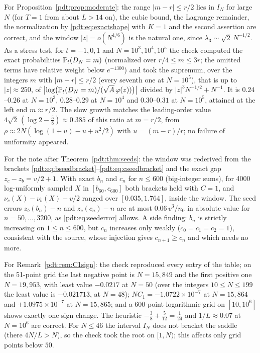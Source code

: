 For Proposition~\ref{pdt:prop:moderate}: the range $|m-r|\le r/2$ lies in
$I_N$ for large $N$ (for $T=1$ from about $L>14$ on), the cubic bound, the
Lagrange remainder, the normalization by \eqref{pdt:eq:exactshape} with
$K=1$ and the second assertion are correct, and the window
$|z|=o(N^{1/6})$ is the natural one, since $\lambda_3\sim\sqrt2\,N^{-1/2}$.
As a stress test, for $t=-1,0,1$ and $N=10^3,10^4,10^5$ the check computed
the exact probabilities $\mathbb P_t(D_N=m)$ (normalized over $r/4\le m\le3r$;
the omitted terms have relative weight below $e^{-1300}$) and took the
supremum, over the integers $m$ with $|m-r|\le r/2$ (every seventh one at
$N=10^5$), that is up to $|z|\approx250$, of
$\bigl|\log\bigl(\mathbb P_t(D_N=m)/(\sqrt A\,\varphi(z))\bigr)\bigr|$ divided by
$|z|^3N^{-1/2}+N^{-1}$. It is $0.24$--$0.26$ at $N=10^3$, $0.28$--$0.29$ at
$N=10^4$ and $0.30$--$0.31$ at $N=10^5$, attained at the left end
$m\approx r/2$. The slow growth matches the leading-order value
$4\sqrt2\,(\log2-\frac58)\approx0.385$ of this ratio at $m=r/2$, from
$\rho\approx2N(\log(1+u)-u+u^2/2)$ with $u=(m-r)/r$; no failure of
uniformity appeared.

For the note after Theorem~\ref{pdt:thm:seeds}: the window was rederived
from the brackets \eqref{pdt:eq:bseedbracket}--\eqref{pdt:eq:cseedbracket}
and the exact gap $z_c-z_b=v/2+1$. With exact $b_n$ and $c_n$ for
$n\le600$ (big-integer sums), for 4000 log-uniformly sampled $X$ in
$[b_{60},c_{600}]$ both brackets held with $C=1$, and
$\nu_c(X)-\nu_b(X)-v/2$ ranged over $[0.035,1.764]$, inside the window. The
seed errors $z_b(b_n)-n$ and $z_c(c_n)-n$ are at most $0.06\,v^3/n_0$ in
absolute value for $n=50,\ldots,3200$, as \eqref{pdt:eq:seederror} allows.
A side finding: $b_n$ is strictly increasing on $1\le n\le600$, but $c_n$
increases only weakly ($c_0=c_1=c_2=1$), consistent with the source, whose
injection gives $c_{n+1}\ge c_n$ and which needs no more.

For Remark~\ref{pdt:rem:C1sign}: the check reproduced every entry of the
table; on the 51-point grid the last negative point is $N=15{,}849$ and
the first positive one $N=19{,}953$, with least value $-0.0217$ at $N=50$
(over the integers $10\le N\le199$ the least value is $-0.021713$, at
$N=48$); $NC_1=-1.0722\times10^{-7}$ at $N=15{,}864$ and
$+1.0975\times10^{-7}$ at $N=15{,}865$; and a 600-point logarithmic grid on
$[10,10^6]$ shows exactly one sign change. The heuristic
$-\frac38+\frac5{12}=\frac1{24}$ and $1/L\approx0.07$ at $N=10^6$ are
correct. For $N\le46$ the interval $I_N$ does not bracket the saddle
(there $4N/L>N$), so the check took the root on $[1,N)$; this affects only
grid points below $50$.

